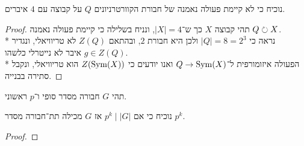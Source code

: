 \Subquestion{}
נוכיח כי לא קיימת פעולה נאמנה של חבורת הקוורטרניונים $Q$ על קבוצה עם $4$ איברים.
\begin{proof}
	תהי קבוצה $X$ כך ש־$|X| = 4$, ונניח בשלילה כי קיימת פעולה נאמנה $Q \circlearrowright X$. \\*
	נראה כי $|Q| = 8 = 2^3$ ולכן היא חבורת $2$, ובהתאם $Z(Q)$ לא טריוויאלי, ונגדיר $g \in Z(Q)$ איבר לא נייטרלי כלשהו. \\*
	הפעולה איזומורפית ל־$Q \to \operatorname{Sym}(X)$ ואנו יודעים כי $Z(\operatorname{Sym}(X))$ הוא טריוויאלי, ונקבל סתירה בבנייה.
\end{proof}

\Question{}
תהי $G$ חבורה מסדר סופי ו־$p$ ראשוני.

\Subquestion{}
נוכיח כי אם $p^k \mid |G|$ אז $G$ מכילה תת־חבורה מסדר $p^k$.
\begin{proof}
	
\end{proof}


